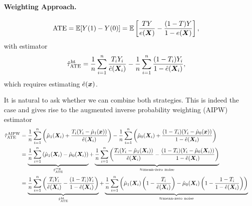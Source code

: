 \documentclass[11pt]{exam}
\begin{document}
\paragraph{Weighting Approach.}
\[
    \mathrm{ATE} = \mathbb{E}[Y(1) - Y(0)] = \mathbb{E}\left[\frac{T Y}{e(\bm{X})} - \frac{(1 - T) Y}{1 - e(\bm{X})}\right],
\]
with estimator
\[
    \hat \tau_{\mathrm{ATE}}^{\mathrm{ht}} = \frac{1}{n} \sum_{i=1}^n \frac{T_i Y_i}{\hat e(\bm{X}_i)} - \frac{1}{n}\sum_{i=1}^n \frac{(1 - T_i) Y_i}{1 - \hat e(\bm{X}_i)},
\]
which requires estimating $\hat e(\bm{x})$.

It is natural to ask whether we can combine both strategies. This is indeed the case and gives rise to the augmented inverse probability weighting (AIPW) estimator \citep{robins1994estimation}
\begin{align*}
     \hat \tau_{\mathrm{ATE}}^{\mathrm{AIPW}} &=  \frac{1}{n} \sum_{i=1}^n \left(\hat \mu_1(\bm{X}_i)  + \frac{T_i (Y_i - \hat \mu_1(\bm{x}))}{\hat e(\bm{X}_i)}\right) - \frac{1}{n}\sum_{i=1}^n \left(\hat \mu_0(\bm{X}_i) + \frac{(1 - T_i) (Y_i - \hat \mu_0(\bm{x}))}{1 - \hat e(\bm{X}_i)}\right)
     \\
     &= \underbrace{\frac{1}{n} \sum_{i=1}^n \left(\hat \mu_1(\bm{X}_i) - \hat \mu_0(\bm{X}_i)\right)}_{\hat \tau_{\mathrm{ATE}}^{\mathrm{reg}}} + \underbrace{\frac{1}{n} \sum_{i=1}^n \left(\frac{T_i (Y_i - \hat \mu_1(\bm{X}_i))}{\hat e(\bm{X}_i)}- \frac{(1 - T_i) (Y_i - \hat \mu_0(\bm{X}_i))}{1 - \hat e(\bm{X}_i)}\right)}_{\approx \text{mean-zero noise}}
     \\
     &= \underbrace{\frac{1}{n} \sum_{i=1}^n \left(\frac{T_i Y_i}{\hat e(\bm{X}_i)} -  \frac{(1 - T_i) Y_i}{1 - \hat e(\bm{X}_i)}\right)}_{\hat \tau_{\mathrm{ATE}}^{\mathrm{ht}}} + \underbrace{\frac{1}{n} \sum_{i=1}^n \left(\hat \mu_1(\bm{X}_i) \left(1 - \frac{T_i}{\hat e(\bm{X}_i)}\right) - \hat \mu_0(\bm{X}_i) \left(1 - \frac{1 - T_i}{1 - \hat e(\bm{X}_i)}\right) \right)}_{\approx \text{mean-zero noise}}
\end{align*}

\end{document}
